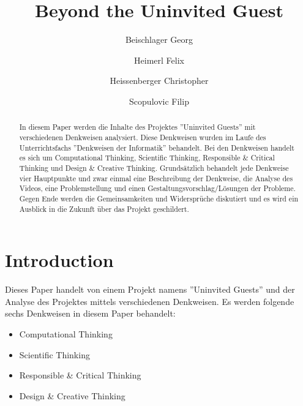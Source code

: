 \documentclass[sigchi-a, authorversion]{acmart}
\begin{document}
\title{Beyond the Uninvited Guest}

\author{Beischlager Georg}

\author{Heimerl Felix}

\author{Heissenberger Christopher}

\author{Scopulovic Filip}

\renewcommand{\shortauthors}{F. Author et al.}

\maketitle

\begin{abstract}
	In diesem Paper werden die Inhalte des Projektes ''Uninvited Guests''\cite{uninvatedGuests} mit verschiedenen Denkweisen analysiert. Diese Denkweisen wurden im Laufe des Unterrichtsfachs ''Denkweisen der Informatik'' behandelt. Bei den Denkweisen handelt es sich um Computational Thinking, Scientific Thinking, Responsible \& Critical Thinking und Design \& Creative Thinking. Grundsätzlich behandelt jede Denkweise vier Hauptpunkte und zwar einmal eine Beschreibung der Denkweise, die Analyse des Videos, eine Problemstellung und einen Gestaltungsvorschlag/Lösungen der Probleme. Gegen Ende werden die Gemeinsamkeiten und Widersprüche diskutiert und es wird ein Ausblick in die Zukunft über das Projekt geschildert.
\end{abstract}

\section{Introduction}

Dieses Paper handelt von einem Projekt namens ''Uninvited Guests''\cite{uninvatedGuests} und der Analyse des Projektes mittels verschiedenen Denkweisen. Es werden folgende sechs Denkweisen in diesem Paper behandelt:
\begin{itemize}
	\item Computational Thinking
	\item Scientific Thinking
	\item Responsible \& Critical Thinking
	\item Design \& Creative Thinking
\end{itemize}
\end{document}
